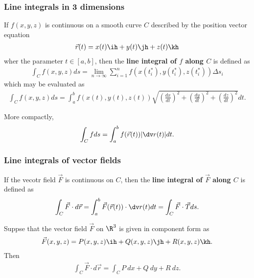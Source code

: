 \documentclass{article}
\begin{document}
\subsubsection{Line integrals in 3 dimensions}

\begin{definition}
    If $f(x,y,z)$ is continuous on a smooth curve $C$ described by the
    position vector equation
    \begin{align*}
        \vec r(t) = x(t)\ih + y(t)\jh + z(t)\kh
    \end{align*}
    wher the parameter $t\in[a,b]$, then the \textbf{line integral of $f$ along $C$}
    is defined as
    \begin{align*}
        \int_C f(x,y,z)ds = \lim_{n\to\infty}\sum_{i=1}^n f(x(t_i^*), y(t_i^*), z(t_i^*))\Delta s_i
    \end{align*}
    which may be evaluated as
    \begin{align*}
        \int_C f(x,y,z)ds = \int_a^b f(x(t), y(t), z(t))\sqrt{\left(\frac{dx}{dt}\right)^2 + \left(\frac{dy}{dt}\right)^2 + \left(\frac{dz}{dt}\right)^2}dt.
    \end{align*}
\end{definition}
\begin{lemma}
    More compactly,
    \begin{align*}
        \int_C f ds = \int_a^b f(\vec r(t))|\dv r(t)|dt.
    \end{align*}
\end{lemma}

\subsubsection{Line integrals of vector fields}

\begin{definition}
    If the vecotr field $\vec F$ is continuous on $C$, then the
    \textbf{line integral of $\vec F$ along $C$} is defined as
    \begin{align*}
        \int_C \vec F\cdot d\vec r = \int_a^b \vec F(\vec r(t))\cdot \dv r(t)dt
        = \int_C \vec F\cdot \vec T ds.
    \end{align*}
\end{definition}
\begin{theorem}
    Suppse that the vector field $\vec F$ on $\R^3$ is given in component
    form as
    \begin{align*}
        \vec F(x,y,z) = P(x,y,z)\ih + Q(x,y,z)\jh + R(x,y,z)\kh.
    \end{align*}
    Then
    \begin{align*}
        \int_C \vec F\cdot d\vec r = \int_C P\:dx + Q\:dy + R\:dz.
    \end{align*}
\end{theorem}
\end{document}
